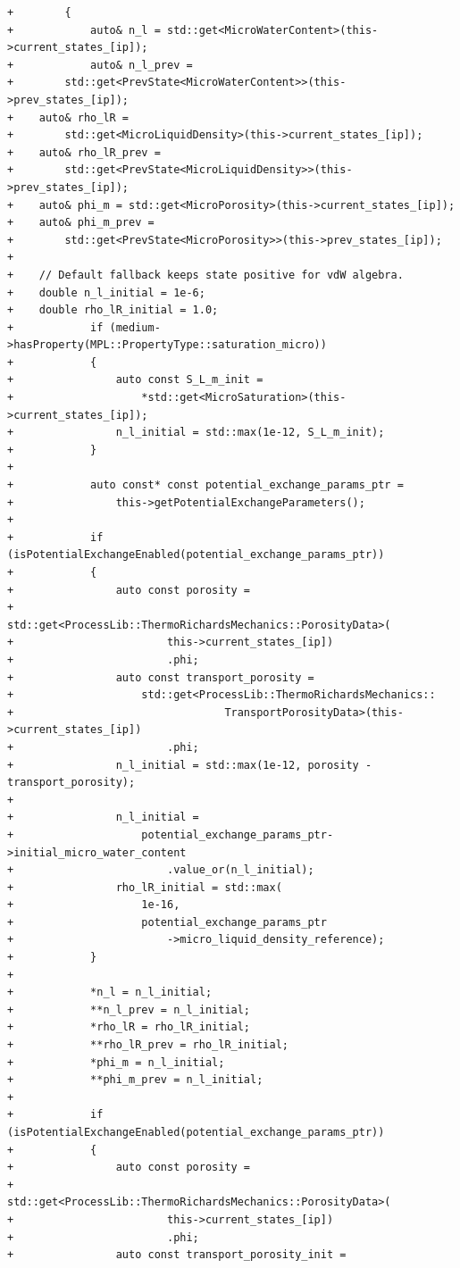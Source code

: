 \documentclass[10pt]{article}
\begin{document}
\begin{lstlisting}
+        {
+            auto& n_l = std::get<MicroWaterContent>(this->current_states_[ip]);
+            auto& n_l_prev =
+        std::get<PrevState<MicroWaterContent>>(this->prev_states_[ip]);
+    auto& rho_lR =
+        std::get<MicroLiquidDensity>(this->current_states_[ip]);
+    auto& rho_lR_prev =
+        std::get<PrevState<MicroLiquidDensity>>(this->prev_states_[ip]);
+    auto& phi_m = std::get<MicroPorosity>(this->current_states_[ip]);
+    auto& phi_m_prev =
+        std::get<PrevState<MicroPorosity>>(this->prev_states_[ip]);
+
+    // Default fallback keeps state positive for vdW algebra.
+    double n_l_initial = 1e-6;
+    double rho_lR_initial = 1.0;
+            if (medium->hasProperty(MPL::PropertyType::saturation_micro))
+            {
+                auto const S_L_m_init =
+                    *std::get<MicroSaturation>(this->current_states_[ip]);
+                n_l_initial = std::max(1e-12, S_L_m_init);
+            }
+
+            auto const* const potential_exchange_params_ptr =
+                this->getPotentialExchangeParameters();
+
+            if (isPotentialExchangeEnabled(potential_exchange_params_ptr))
+            {
+                auto const porosity =
+                    std::get<ProcessLib::ThermoRichardsMechanics::PorosityData>(
+                        this->current_states_[ip])
+                        .phi;
+                auto const transport_porosity =
+                    std::get<ProcessLib::ThermoRichardsMechanics::
+                                 TransportPorosityData>(this->current_states_[ip])
+                        .phi;
+                n_l_initial = std::max(1e-12, porosity - transport_porosity);
+
+                n_l_initial =
+                    potential_exchange_params_ptr->initial_micro_water_content
+                        .value_or(n_l_initial);
+                rho_lR_initial = std::max(
+                    1e-16,
+                    potential_exchange_params_ptr
+                        ->micro_liquid_density_reference);
+            }
+
+            *n_l = n_l_initial;
+            **n_l_prev = n_l_initial;
+            *rho_lR = rho_lR_initial;
+            **rho_lR_prev = rho_lR_initial;
+            *phi_m = n_l_initial;
+            **phi_m_prev = n_l_initial;
+
+            if (isPotentialExchangeEnabled(potential_exchange_params_ptr))
+            {
+                auto const porosity =
+                    std::get<ProcessLib::ThermoRichardsMechanics::PorosityData>(
+                        this->current_states_[ip])
+                        .phi;
+                auto const transport_porosity_init =

\end{lstlisting}
\end{document}
